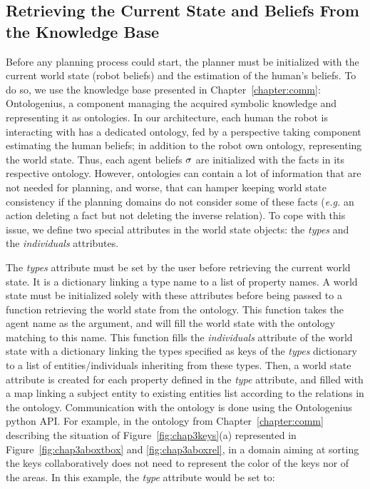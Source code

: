 \documentclass[a4paper,11pt,twoside]{StyleThese}
\begin{document}
\subsection{Retrieving the Current State and Beliefs From the Knowledge Base}
Before any planning process could start, the planner must be initialized with the current world state (robot beliefs) and the estimation of the human's beliefs. To do so, we use the knowledge base presented in Chapter~\ref{chapter:comm}: Ontologenius, a component managing the acquired symbolic knowledge and representing it as ontologies. In our architecture, each human the robot is interacting with has a dedicated ontology, fed by a perspective taking component estimating the human beliefs; in addition to the robot own ontology, representing the world state. Thus, each agent beliefs $\sigma$ are initialized with the facts in its respective ontology.
However, ontologies can contain a lot of information that are not needed for planning, and worse, that can hamper keeping world state consistency if the planning domains do not consider some of these facts (\textit{e.g.} an action deleting a fact but not deleting the inverse relation). To cope with this issue, we define two special attributes in the world state objects: the \textit{types} and the \textit{individuals} attributes.

The \textit{types} attribute must be set by the user before retrieving the current world state. It is a dictionary linking a type name to a list of property names. A world state must be initialized solely with these attributes before being passed to a function retrieving the world state from the ontology. This function takes the agent name as the argument, and will fill the world state with the ontology matching to this name. This function fills the \textit{individuals} attribute of the world state with a dictionary linking the types specified as keys of the  \textit{types} dictionary to a list of entities/individuals inheriting from these types. Then, a world state attribute is created for each property defined in the \textit{type} attribute, and filled with a map linking a subject entity to existing entities list according to the relations in the ontology. Communication with the ontology is done using the Ontologenius~\cite{sarthou2019ontologenius} python API. For example, in the ontology from Chapter~\ref{chapter:comm} describing the situation of Figure~\ref{fig:chap3keys}(a) represented in Figure~\ref{fig:chap3aboxtbox} and \ref{fig:chap3aboxrel}, in a domain aiming at sorting the keys collaboratively does not need to represent the color of the keys nor of the areas. In this example, the \textit{type} attribute would be set to: 
\end{document}
